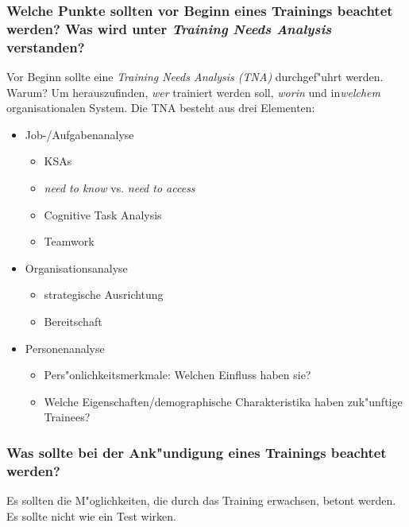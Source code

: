 \subsubsection{Welche Punkte sollten vor Beginn eines Trainings beachtet werden? Was wird unter \emph{Training Needs Analysis} verstanden?}
Vor Beginn sollte eine \emph{Training Needs Analysis (TNA)} durchgef"uhrt werden. Warum? Um herauszufinden, \emph{wer} trainiert werden soll, \emph{worin} und in\emph{welchem} organisationalen System. Die TNA besteht aus drei Elementen:
\begin{itemize}
        \item Job-/Aufgabenanalyse
                \begin{itemize}
                        \item KSAs
                        \item \emph{need to know} vs. \emph{need to access}
                        \item Cognitive Task Analysis
                        \item Teamwork
                \end{itemize}
        \item Organisationsanalyse
                \begin{itemize}
                        \item strategische Ausrichtung
                        \item Bereitschaft
                \end{itemize}
        \item Personenanalyse
                \begin{itemize}
                        \item Pers"onlichkeitsmerkmale: Welchen Einfluss haben sie?
                        \item Welche Eigenschaften/demographische Charakteristika haben zuk"unftige Trainees?
                \end{itemize}
\end{itemize}

\subsubsection{Was sollte bei der Ank"undigung eines Trainings beachtet werden?}
Es sollten die M"oglichkeiten, die durch das Training erwachsen, betont werden. Es sollte nicht wie ein Test wirken.

